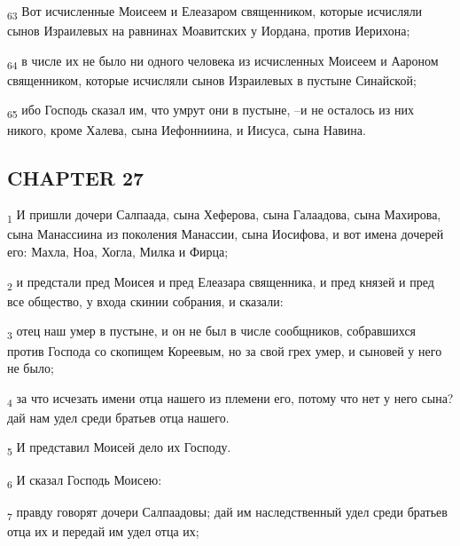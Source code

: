 \begin{tcolorbox}
\textsubscript{63} Вот исчисленные Моисеем и Елеазаром священником, которые исчисляли сынов Израилевых на равнинах Моавитских у Иордана, против Иерихона;
\end{tcolorbox}
\begin{tcolorbox}
\textsubscript{64} в числе их не было ни одного человека из исчисленных Моисеем и Аароном священником, которые исчисляли сынов Израилевых в пустыне Синайской;
\end{tcolorbox}
\begin{tcolorbox}
\textsubscript{65} ибо Господь сказал им, что умрут они в пустыне, --и не осталось из них никого, кроме Халева, сына Иефонниина, и Иисуса, сына Навина.
\end{tcolorbox}
\subsection{CHAPTER 27}
\begin{tcolorbox}
\textsubscript{1} И пришли дочери Салпаада, сына Хеферова, сына Галаадова, сына Махирова, сына Манассиина из поколения Манассии, сына Иосифова, и вот имена дочерей его: Махла, Ноа, Хогла, Милка и Фирца;
\end{tcolorbox}
\begin{tcolorbox}
\textsubscript{2} и предстали пред Моисея и пред Елеазара священника, и пред князей и пред все общество, у входа скинии собрания, и сказали:
\end{tcolorbox}
\begin{tcolorbox}
\textsubscript{3} отец наш умер в пустыне, и он не был в числе сообщников, собравшихся против Господа со скопищем Кореевым, но за свой грех умер, и сыновей у него не было;
\end{tcolorbox}
\begin{tcolorbox}
\textsubscript{4} за что исчезать имени отца нашего из племени его, потому что нет у него сына? дай нам удел среди братьев отца нашего.
\end{tcolorbox}
\begin{tcolorbox}
\textsubscript{5} И представил Моисей дело их Господу.
\end{tcolorbox}
\begin{tcolorbox}
\textsubscript{6} И сказал Господь Моисею:
\end{tcolorbox}
\begin{tcolorbox}
\textsubscript{7} правду говорят дочери Салпаадовы; дай им наследственный удел среди братьев отца их и передай им удел отца их;
\end{tcolorbox}
